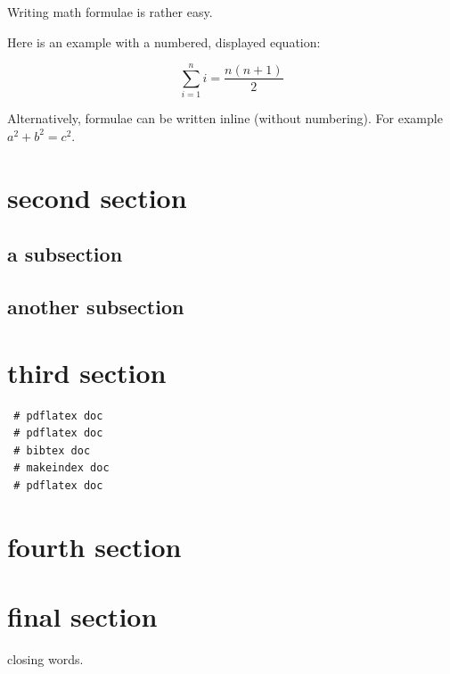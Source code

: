 \documentclass[12pt,reqno,a4paper]{amsart}
\begin{document}
Writing math formulae is rather easy. 

Here is an example with a numbered, displayed equation:


\begin{equation}
\label{eq:example}
\sum_{i=1}^{n}i = \frac{n(n+1)}{2}
\end{equation}


 Alternatively, formulae can be written inline (without numbering). For example $a^2 + b^2 = c^2$.

\section{second section}

\subsection{a subsection}


\subsection{another subsection}


\section{third section}


\begin{lstlisting}
 # pdflatex doc
 # pdflatex doc
 # bibtex doc
 # makeindex doc
 # pdflatex doc
\end{lstlisting}


\section{fourth section}







\section{final section}

closing words.



\printindex
{}



{}


\end{document}
